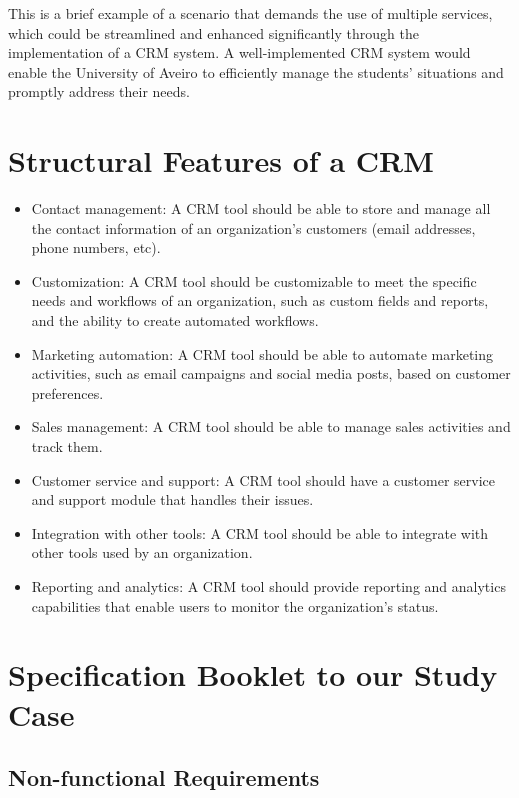 \documentclass{article}
\begin{document}
This is a brief example of a scenario that demands the use of multiple services, which could be streamlined and enhanced significantly through the implementation of a CRM system. A well-implemented CRM system would enable the University of Aveiro to efficiently manage the students' situations and promptly address their needs.


\section{Structural Features of a CRM}

\begin{itemize}
    \item Contact management: A CRM tool should be able to store and manage all the contact information of an organization's customers (email addresses, phone numbers, etc).

    \item Customization: A CRM tool should be customizable to meet the specific needs and workflows of an organization, such as custom fields and reports, and the ability to create automated workflows.

    \item Marketing automation: A CRM tool should be able to automate marketing activities, such as email campaigns and social media posts, based on customer preferences.

    \item Sales management: A CRM tool should be able to manage sales activities and track them.

    \item Customer service and support: A CRM tool should have a customer service and support module that handles their issues.

    \item Integration with other tools: A CRM tool should be able to integrate with other tools used by an organization.

    \item Reporting and analytics: A CRM tool should provide reporting and analytics capabilities that enable users to monitor the organization's status.
\end{itemize}


\section{Specification Booklet to our Study Case}

\subsection{Non-functional Requirements}
\end{document}
